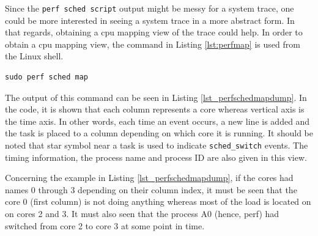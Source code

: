 \begin{itemize}
	
	
	Since the \texttt{perf sched script} output might be messy for a system trace, one could be more interested in seeing a system trace in a more abstract form. In that regards, obtaining a cpu mapping view of the trace could help. In order to obtain a cpu mapping view, the command in Listing \ref{lst:perfmap} is used from the Linux shell.
	\begin{lstlisting}[caption={Obtaining CPU mapping view using perf},label={lst:perfmap},style=bash]
		sudo perf sched map
	\end{lstlisting}
	The output of this command can be seen in Listing \ref{lst_perfschedmapdump}. In the code, it is shown that each column represents a core whereas vertical axis is the time axis. In other words, each time an event occurs, a new line is added and the task is placed to a column depending on which core it is running. It should be noted that star symbol near a task is used to indicate \texttt{sched\texttt{\_}switch} events. The timing information, the process name and process ID are also given in this view. 
	
	Concerning the example in Listing \ref{lst_perfschedmapdump}, if the cores had names 0 through 3 depending on their column index, it must be seen that the core 0 (first column) is not doing anything whereas most of the load is located on on cores 2 and 3. It must also seen that the process A0 (hence, perf) had switched from core 2 to core 3 at some point in time.
	

\end{itemize}

